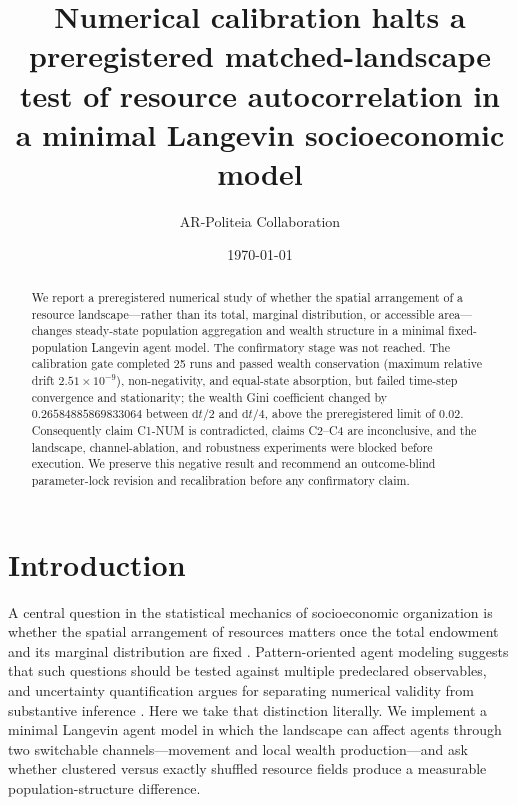 \documentclass[aps,prl,reprint,superscriptaddress,amsmath,amssymb]{revtex4-2}
\begin{document}
\title{Numerical calibration halts a preregistered matched-landscape test of resource autocorrelation in a minimal Langevin socioeconomic model}

\author{AR-Politeia Collaboration}
\date{\today}

\begin{abstract}
We report a preregistered numerical study of whether the spatial arrangement of a resource landscape---rather than its total, marginal distribution, or accessible area---changes steady-state population aggregation and wealth structure in a minimal fixed-population Langevin agent model. The confirmatory stage was not reached. The calibration gate completed 25 runs and passed wealth conservation (maximum relative drift $2.51\times10^{-9}$), non-negativity, and equal-state absorption, but failed time-step convergence and stationarity; the wealth Gini coefficient changed by $0.26584885869833064$ between $\mathrm{d}t/2$ and $\mathrm{d}t/4$, above the preregistered limit of $0.02$. Consequently claim C1-NUM is contradicted, claims C2--C4 are inconclusive, and the landscape, channel-ablation, and robustness experiments were blocked before execution. We preserve this negative result and recommend an outcome-blind parameter-lock revision and recalibration before any confirmatory claim.
\end{abstract}

\maketitle

\section{Introduction}

A central question in the statistical mechanics of socioeconomic organization is whether the spatial arrangement of resources matters once the total endowment and its marginal distribution are fixed \cite{duran2025, bae2026}. Pattern-oriented agent modeling suggests that such questions should be tested against multiple predeclared observables, and uncertainty quantification argues for separating numerical validity from substantive inference \cite{grimm2005, mcculloch2022}. Here we take that distinction literally. We implement a minimal Langevin agent model in which the landscape can affect agents through two switchable channels---movement and local wealth production---and ask whether clustered versus exactly shuffled resource fields produce a measurable population-structure difference.
\end{document}
